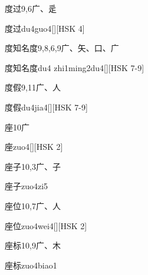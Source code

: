 \begin{Entry}{度过}{9,6}{⼴、⾡}
  \begin{Phonetics}{度过}{du4guo4}[][HSK 4]
  \end{Phonetics}
\end{Entry}

\begin{Entry}{度知名度}{9,8,6,9}{⼴、⽮、⼝、⼴}
  \begin{Phonetics}{度知名度}{du4 zhi1ming2du4}[][HSK 7-9]
  \end{Phonetics}
\end{Entry}

\begin{Entry}{度假}{9,11}{⼴、⼈}
  \begin{Phonetics}{度假}{du4jia4}[][HSK 7-9]
  \end{Phonetics}
\end{Entry}

\begin{Entry}{座}{10}{⼴}
  \begin{Phonetics}{座}{zuo4}[][HSK 2]
  \end{Phonetics}
\end{Entry}

\begin{Entry}{座子}{10,3}{⼴、⼦}
  \begin{Phonetics}{座子}{zuo4zi5}
  \end{Phonetics}
\end{Entry}

\begin{Entry}{座位}{10,7}{⼴、⼈}
  \begin{Phonetics}{座位}{zuo4wei4}[][HSK 2]
  \end{Phonetics}
\end{Entry}

\begin{Entry}{座标}{10,9}{⼴、⽊}
  \begin{Phonetics}{座标}{zuo4biao1}
  \end{Phonetics}
\end{Entry}

